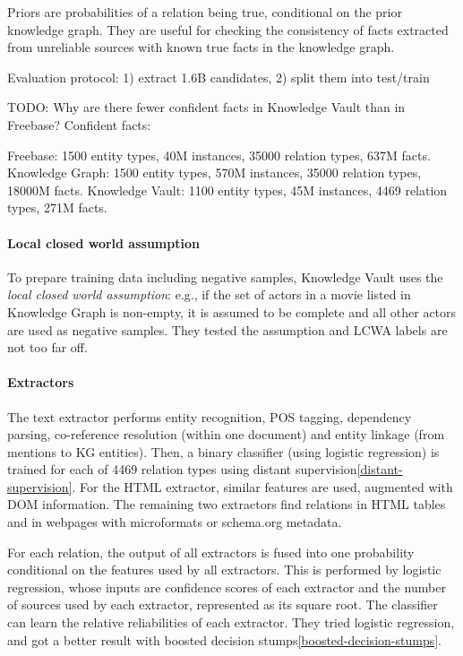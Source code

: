 Priors are probabilities of a relation being true, conditional
on the prior knowledge graph. They are useful for checking the consistency of
facts extracted from unreliable sources with known true facts in the knowledge
graph.

Evaluation protocol: 1) extract 1.6B candidates, 2) split them into test/train

TODO: Why are there fewer confident facts in Knowledge Vault than in Freebase?
Confident facts:

Freebase: 1500 entity types, 40M instances, 35000 relation types, 637M
facts.
Knowledge Graph: 1500 entity types, 570M instances, 35000 relation types, 18000M
facts.
Knowledge Vault: 1100 entity types, 45M instances, 4469 relation types, 271M
facts.

\paragraph{Local closed world assumption}
\label{lcwa}
To prepare training data including negative samples, Knowledge Vault uses the
\textit{local closed world assumption}: e.g., if the set of actors in a movie listed
in Knowledge Graph is non-empty, it is assumed to be complete and all other
actors are used as negative samples.
They tested the assumption and LCWA labels are not too far off.

\paragraph{Extractors}
The text extractor performs entity recognition, POS tagging, dependency parsing,
co-reference resolution (within one document) and entity linkage (from mentions
to KG entities).
Then, a binary classifier (using logistic regression) is trained for each of
4469 relation types using distant supervision\ref{distant-supervision}.
For the HTML extractor, similar features are used, augmented with DOM
information.
The remaining two extractors find relations in HTML tables and in webpages
with microformats or schema.org metadata.

For each relation, the output of all extractors is fused into one probability
conditional on the features used by all extractors. This is performed by
logistic regression, whose inputs are confidence scores of each extractor and
the number of sources used by each extractor, represented as its square root.
The classifier can learn the relative reliabilities of each extractor.
They tried logistic regression, and got a better result with boosted decision
stumps\ref{boosted-decision-stumps}.

